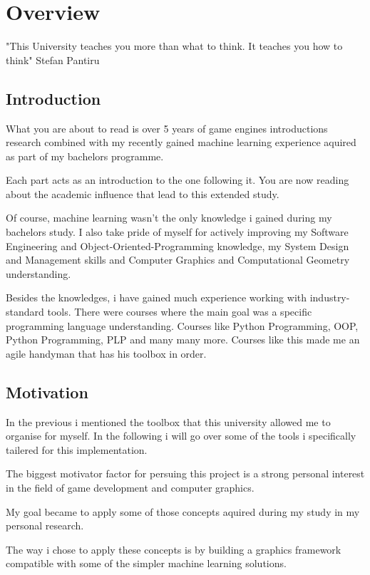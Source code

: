 \part{Overview}
  "This University teaches you more than what to think. It teaches you how to think" Stefan Pantiru
  \chapter*{Introduction} 
    What you are about to read is over 5 years of game engines introductions research combined with my recently gained machine learning experience aquired as part of my bachelors programme. 

    Each part acts as an introduction to the one following it. You are now reading about the academic influence that lead to this extended study.

    Of course, machine learning wasn't the only knowledge i gained during my bachelors study. I also take pride of myself for actively improving my Software Engineering and Object-Oriented-Programming knowledge, my System Design and Management skills and Computer Graphics and Computational Geometry understanding. 

    Besides the knowledges, i have gained much experience working with industry-standard tools. There were courses where the main goal was a specific programming language understanding. Courses like Python Programming, OOP, Python Programming, PLP and many many more. Courses like this made me an agile handyman that has his toolbox in order.

  \chapter*{Motivation}

  In the previous i mentioned the toolbox that this university allowed me to organise for myself. In the following i will go over some of the tools i specifically tailered for this implementation.

  The biggest motivator factor for persuing this project is a strong personal interest in the field of game development and computer graphics.

  My goal became to apply some of those concepts aquired during my study in my personal research.

  The way i chose to apply these concepts is by building a graphics framework compatible with some of the simpler machine learning solutions.

